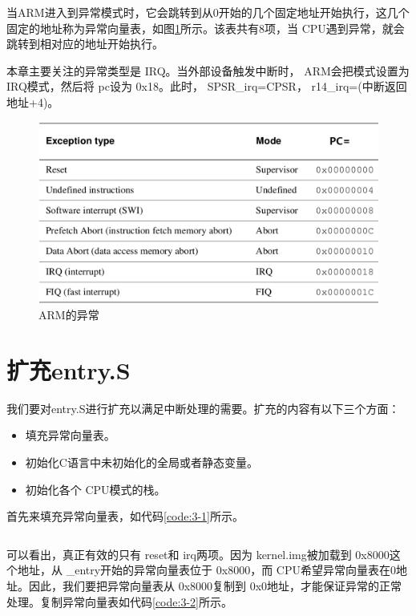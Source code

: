 \documentclass[main.tex]{subfiles}
\begin{document}
\begin{CJK*}{UTF8}{song}
当ARM进入到异常模式时，它会跳转到从0开始的几个固定地址开始执行，这几个固定的地址称为异常向量表，如图\ref{figure:3-2}所示。该表共有8项，当 CPU遇到异常，就会跳转到相对应的地址开始执行。

\par
本章主要关注的异常类型是 IRQ。当外部设备触发中断时， ARM会把模式设置为 IRQ模式，然后将 pc设为 0x18。此时， SPSR\_irq=CPSR， r14\_irq=(中断返回地址+4)。

\begin{figure}[htp]
\centering
\includegraphics[scale=0.35]{figures/3-2.png}
\caption{ARM的异常}
\label{figure:3-2}
\end{figure}

\section{扩充entry.S}
我们要对entry.S进行扩充以满足中断处理的需要。扩充的内容有以下三个方面：
\begin{itemize}
\item 填充异常向量表。
\item 初始化C语言中未初始化的全局或者静态变量。
\item 初始化各个 CPU模式的栈。
\end{itemize}

首先来填充异常向量表，如代码\ref{code:3-1}所示。

\begin{code}
\label{code:3-1}
\inputminted[firstline=73,lastline=104,linenos,numbersep=5pt,frame=lines,framesep=2mm]{gas}{src/chapter03/kernel/entry.S}
\end{code}

可以看出，真正有效的只有 reset和 irq两项。因为 kernel.img被加载到 0x8000这个地址，从 \_entry开始的异常向量表位于 0x8000，而 CPU希望异常向量表在0地址。因此，我们要把异常向量表从 0x8000复制到 0x0地址，才能保证异常的正常处理。复制异常向量表如代码\ref{code:3-2}所示。


\end{CJK*}
\end{document}
